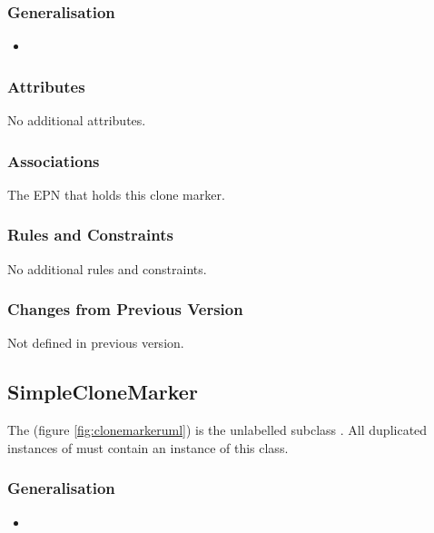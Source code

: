 \subsubsection{Generalisation}

\begin{itemize}
\item {}
\end{itemize}

\subsubsection{Attributes}

No additional attributes.

\subsubsection{Associations}

\begin{attributes}
 The EPN that holds this
clone marker.
\end{attributes}

\subsubsection{Rules and Constraints}

No additional rules and constraints.

\subsubsection{Changes from Previous Version}

Not defined in previous version.

\subsection{SimpleCloneMarker}

The  (figure \ref{fig:clonemarkeruml}) is
the unlabelled subclass . All duplicated
instances of  must contain an instance of this
class.

\subsubsection{Generalisation}

\begin{itemize}
\item {}
\end{itemize}

